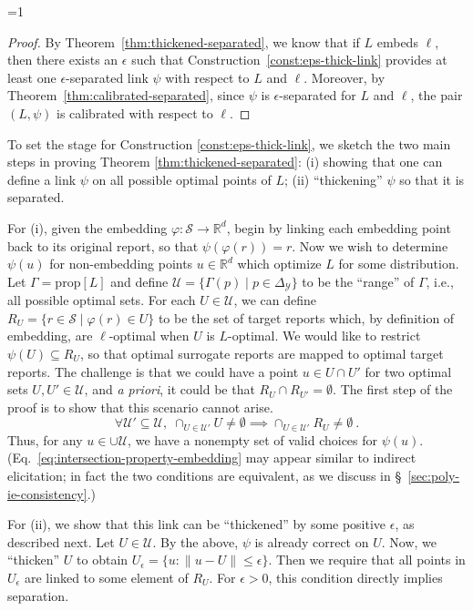 \documentclass[twoside,11pt]{article}
\newcommand{\CommentsR}{1}
\newcommand{\reviewerresponse}[2]{\ifnum\CommentsR=1%
  \todo[linecolor=#1!80!black,backgroundcolor=#1,bordercolor=#1!80!black]{#2}\fi}
\newcommand{\reviewerone}[1]{\reviewerresponse{orange!20!white}{R1: #1}}
\newcommand{\reals}{\mathbb{R}}
\newcommand{\prop}[1]{\mathrm{prop}[#1]}
\newcommand{\simplex}{\Delta_\Y}
\newcommand{\Sc}{\mathcal{S}}
\newcommand{\U}{\mathcal{U}}
\newcommand{\Y}{\mathcal{Y}}
\begin{document}
\reviewerone{Restated theorem 2 and gave formal proof}
\linkinformal*
\begin{proof}
	By Theorem~\ref{thm:thickened-separated}, we know that if $L$ embeds $\ell$, then there exists an $\epsilon$ such that Construction~\ref{const:eps-thick-link} provides at least one $\epsilon$-separated link $\psi$ with respect to $L$ and $\ell$.
	Moreover, by Theorem~\ref{thm:calibrated-separated}, since $\psi$ is $\epsilon$-separated for $L$ and $\ell$, the pair $(L,\psi)$ is calibrated with respect to $\ell$.
\end{proof}

To set the stage for Construction \ref{const:eps-thick-link}, we sketch the two main steps in proving Theorem \ref{thm:thickened-separated}: (i) showing that one can define a link $\psi$ on all possible optimal points of $L$; (ii) ``thickening'' $\psi$ so that it is separated.

For (i), given the embedding $\varphi: \Sc\to\reals^d$, begin by linking each embedding point back to its original report, so that $\psi(\varphi(r)) = r$.
Now we wish to determine $\psi(u)$ for non-embedding points $u\in\reals^d$ which optimize $L$ for some distribution.
Let $\Gamma = \prop L$ and define $\U = \{\Gamma(p) \mid p\in\simplex\}$ to be the ``range'' of $\Gamma$, i.e., all possible optimal sets.
For each $U\in\U$, we can define $R_U = \{ r\in\Sc \mid \varphi(r) \in U\}$ to be the set of target reports which, by definition of embedding, are $\ell$-optimal when $U$ is $L$-optimal.
We would like to restrict $\psi(U) \subseteq R_U$, so that optimal surrogate reports are mapped to optimal target reports.
The challenge is that we could have a point $u\in U\cap U'$ for two optimal sets $U,U'\in\U$, and \emph{a priori}, it could be that $R_U \cap R_{U'} = \emptyset$.
The first step of the proof is to show that this scenario cannot arise.
\begin{equation}
  \label{eq:intersection-property-embedding}
  \forall \U'\subseteq\U, \; \cap_{U\in\U'} U \neq \emptyset \implies \cap_{U\in\U'} R_U \neq \emptyset~.
\end{equation}
\noindent
Thus, for any $u\in\cup\U$, we have a nonempty set of valid choices for $\psi(u)$.
(Eq.~\eqref{eq:intersection-property-embedding} may appear similar to indirect elicitation; in fact the two conditions are equivalent, as we discuss in \S~\ref{sec:poly-ie-consistency}.)

For (ii), we show that this link can be ``thickened'' by some positive $\epsilon$, as described next.
Let $U\in\U$.
By the above, $\psi$ is already correct on $U$.
Now, we ``thicken'' $U$ to obtain $U_{\epsilon} = \{u : \|u - U\| \leq \epsilon\}$.
Then we require that all points in $U_{\epsilon}$ are linked to some element of $R_U$.
For $\epsilon > 0$, this condition directly implies separation.
\end{document}
